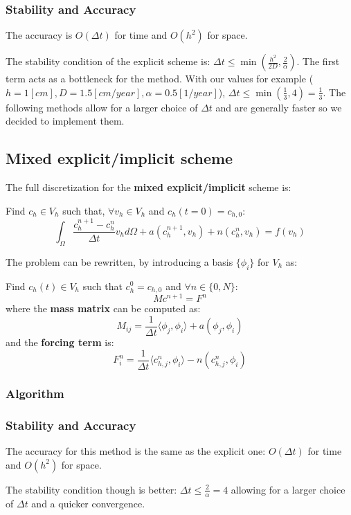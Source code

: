 \documentclass[12pt, letterpaper]{article}
\begin{document}
\subsubsection{Stability and Accuracy}
The accuracy is $O(\Delta t)$ for time and $O(h^2)$ for space.

\noindent The stability condition of the explicit scheme is: $\Delta t\leq\min(\frac{h^2}{2D}, \frac2\alpha)$. The first term acts as a bottleneck for the method. With our values for example ($h=1[cm], D=1.5[cm/year], \alpha=0.5[1/year]$), $\Delta t\leq\min(\frac13, 4)=\frac13$. The following methods allow for a larger choice of $\Delta t$ and are generally faster so we decided to implement them.

\subsection{Mixed explicit/implicit scheme}
The full discretization for the \textbf{mixed explicit/implicit} scheme is:

\vspace{1em}
\noindent
Find $c_h\in V_h$ such that, $\forall v_h\in V_h$ and $c_h(t=0)=c_{h,0}$:
$$\int_\Omega\frac{c_h^{n+1}-c_h^n}{\Delta t}v_hd\Omega+a(c_h^{n+1},v_h)+n(c_h^n,v_h)=f(v_h)$$

\noindent The problem can be rewritten, by introducing a basis $\{\phi_i\}$ for $V_h$ as:

\vspace{1em}
\noindent
Find $c_h(t)\in V_h$ such that $c_h^0=c_{h,0}$ and $\forall n\in\{0, N\}$:
$$Mc^{n+1}=F^n$$
where the \textbf{mass matrix} can be computed as:
$$M_{ij}=\frac1{\Delta t}\langle\phi_j,\phi_i\rangle+a(\phi_j,\phi_i)$$
and the \textbf{forcing term} is:
$$F_i^n=\frac1{\Delta t}\langle c_{h,j}^n,\phi_i\rangle-n(c_{h,j}^n,\phi_i)$$

\subsubsection{Algorithm}

\subsubsection{Stability and Accuracy}
The accuracy for this method is the same as the explicit one: $O(\Delta t)$ for time and $O(h^2)$ for space.

\noindent The stability condition though is better: $\Delta t\leq\frac2\alpha=4$ allowing for a larger choice of $\Delta t$ and a quicker convergence.
\end{document}
